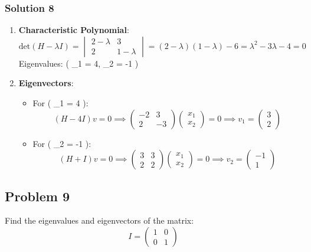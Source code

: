 \documentclass[
  letterpaper,
  DIV=11,
  numbers=noendperiod]{scrartcl}
\providecommand{\tightlist}{%
  \setlength{\itemsep}{0pt}\setlength{\parskip}{0pt}}\usepackage{longtable,booktabs,array}
\begin{document}
\subsubsection{Solution 8}\label{solution-8}

\begin{enumerate}
\def\labelenumi{\arabic{enumi}.}
\item
  \textbf{Characteristic Polynomial}: \[
  \text{det}(H - \lambda I) = \begin{vmatrix} 2 - \lambda & 3 \\ 2 & 1 - \lambda \end{vmatrix} = (2 - \lambda)(1 - \lambda) - 6 = \lambda^2 - 3\lambda - 4 = 0
  \] Eigenvalues: ( \lambda\_1 = 4, \lambda\_2 = -1 )
\item
  \textbf{Eigenvectors}:

  \begin{itemize}
  \tightlist
  \item
    For ( \lambda\_1 = 4 ): \[
    (H - 4I)v = 0 \implies \begin{pmatrix} -2 & 3 \\ 2 & -3 \end{pmatrix}\begin{pmatrix} x_1 \\ x_2 \end{pmatrix} = 0 \implies v_1 = \begin{pmatrix} 3 \\ 2 \end{pmatrix}
    \]
  \item
    For ( \lambda\_2 = -1 ): \[
    (H + I)v = 0 \implies \begin{pmatrix} 3 & 3 \\ 2 & 2 \end{pmatrix}\begin{pmatrix} x_1 \\ x_2 \end{pmatrix} = 0 \implies v_2 = \begin{pmatrix} -1 \\ 1 \end{pmatrix}
    \]
  \end{itemize}
\end{enumerate}

\subsection{Problem 9}\label{problem-9}

Find the eigenvalues and eigenvectors of the matrix: \[
I = \begin{pmatrix} 1 & 0 \\ 0 & 1 \end{pmatrix}
\]
\end{document}
